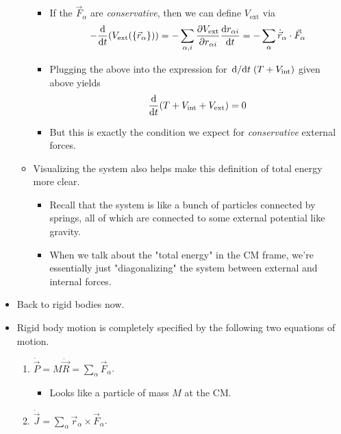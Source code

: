 \documentclass[../notes.tex]{subfiles}
\begin{document}
\begin{itemize}
\begin{itemize}
        \begin{itemize}
            \item If the $\vec{F}_\alpha$ are \emph{conservative}, then we can define $V_\text{ext}$ via
            \begin{equation*}
                -\dv{t}(V_\text{ext}(\{\vec{r}_\alpha\})) = -\sum_{\alpha,i}\pdv{V_\text{ext}}{r_{\alpha i}}\dv{r_{\alpha i}}{t}
                = -\sum_\alpha\dot{\vec{r}}_\alpha\cdot\vec{F}_\alpha
            \end{equation*}
            \item Plugging the above into the expression for $\dv*{t}(T+V_\text{int})$ given above yields
            \begin{equation*}
                \dv{t}(T+V_\text{int}+V_\text{ext}) = 0
            \end{equation*}
            \item But this is exactly the condition we expect for \emph{conservative} external forces.
        \end{itemize}
        \item Visualizing the system also helps make this definition of total energy more clear.
        \begin{itemize}
            \item Recall that the system is like a bunch of particles connected by springs, all of which are connected to some external potential like gravity.
            \item When we talk about the "total energy" in the CM frame, we're essentially just "diagonalizing" the system between external and internal forces.
        \end{itemize}
    \end{itemize}
    \item Back to rigid bodies now.
    \item Rigid body motion is completely specified by the following two equations of motion.
    \begin{enumerate}
        \item $\dot{\vec{P}}=M\ddot{\vec{R}}=\sum_\alpha\vec{F}_\alpha$.
        \begin{itemize}
            \item Looks like a particle of mass $M$ at the CM.
        \end{itemize}
        \item $\dot{\vec{J}}=\sum_\alpha\vec{r}_\alpha\times\vec{F}_\alpha$.
    \end{enumerate}

\end{itemize}
\end{document}
